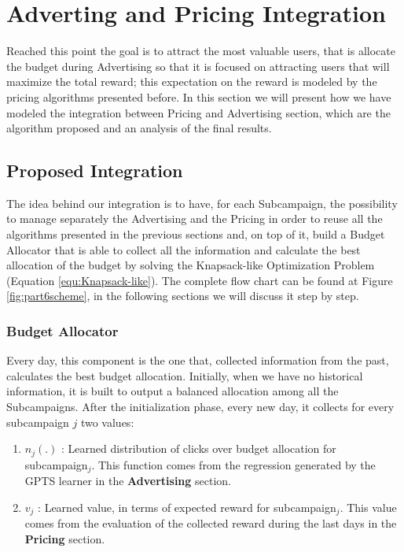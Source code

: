 \chapter{Adverting and Pricing Integration}

\setcounter{equ}{2}

Reached this point the goal is to attract the most valuable users, that is allocate the budget during Advertising so that it is focused on attracting users that will maximize the total reward; this expectation on the reward is modeled by the pricing algorithms presented before. In this section we will present how we have modeled the integration between Pricing and Advertising section, which are the algorithm proposed and an analysis of the final results.


\section{Proposed Integration}
The idea behind our integration is to have, for each Subcampaign, the possibility to manage separately the Advertising and the Pricing in order to reuse all the algorithms presented in the previous sections and, on top of it, build a Budget Allocator that is able to collect all the information and calculate the best allocation of the budget by solving the Knapsack-like Optimization Problem (Equation \ref{equ:Knapsack-like}).
The complete flow chart can be found at Figure \ref{fig:part6scheme}, in the following sections we will discuss it step by step.

\subsection{Budget Allocator}
Every day, this component is the one that, collected information from the past, calculates the best budget allocation. Initially, when we have no historical information, it is built to output a balanced allocation among all the Subcampaigns. After the initialization phase, every new day, it collects for every subcampaign $ j $ two values:

\begin{enumerate}
    \item $ n_j (.) $ : Learned distribution of clicks over budget allocation for subcampaign$_j$. This function comes from the regression generated by the GPTS learner in the   \textbf{Advertising} section.
    \item $ v_j $ : Learned value, in terms of expected reward for subcampaign$_j$. This value comes from the evaluation of the collected reward during the last days in the \textbf{Pricing} section.
\end{enumerate}

